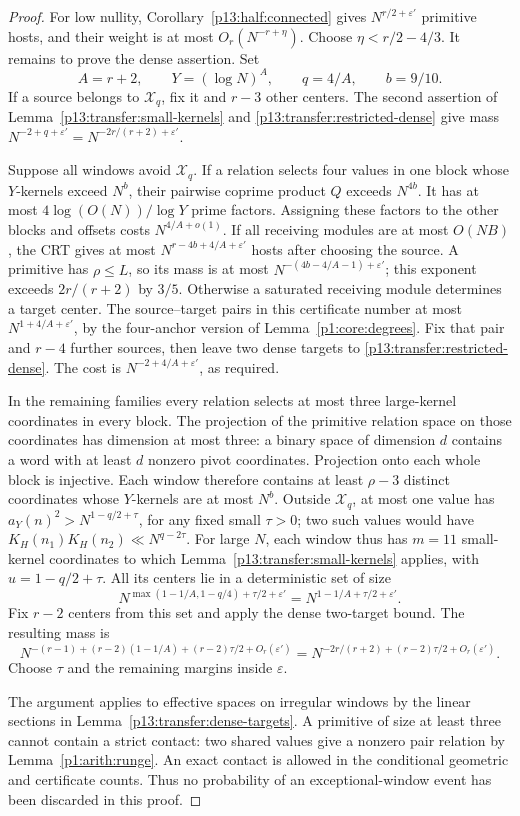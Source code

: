 \begin{proof}
For low nullity, Corollary~\ref{p13:half:connected} gives
$N^{r/2+\varepsilon'}$ primitive hosts, and their weight is at most
$O_r(N^{-r+\eta})$. Choose $\eta<r/2-4/3$.
It remains to prove the dense assertion. Set
\[
 A=r+2,\qquad Y=(\log N)^A,\qquad q=4/A,\qquad b=9/10.
\]
If a source belongs to $\mathcal X_q$, fix it and $r-3$ other centers.
The second assertion of Lemma~\ref{p13:transfer:small-kernels} and
\eqref{p13:transfer:restricted-dense} give mass
$N^{-2+q+\varepsilon'}=N^{-2r/(r+2)+\varepsilon'}$.

Suppose all windows avoid $\mathcal X_q$. If a relation selects four
values in one block whose $Y$-kernels exceed $N^b$, their pairwise
coprime product $Q$ exceeds $N^{4b}$. It has at most
$4\log(O(N))/\log Y$ prime factors. Assigning these factors to the
other blocks and offsets costs $N^{4/A+o(1)}$.
If all receiving modules are at most $O(NB)$, the CRT gives at most
$N^{r-4b+4/A+\varepsilon'}$ hosts after choosing the source.
A primitive has $\rho\leq L$, so its mass is at most
$N^{-(4b-4/A-1)+\varepsilon'}$; this exponent exceeds
$2r/(r+2)$ by $3/5$.
Otherwise a saturated receiving module determines a target center.
The source--target pairs in this certificate number at most
$N^{1+4/A+\varepsilon'}$, by the four-anchor version of
Lemma~\ref{p1:core:degrees}. Fix that pair and $r-4$ further sources,
then leave two dense targets to \eqref{p13:transfer:restricted-dense}.
The cost is $N^{-2+4/A+\varepsilon'}$, as required.

In the remaining families every relation selects at most three
large-kernel coordinates in every block. The projection of the
primitive relation space on those coordinates has dimension at most
three: a binary space of dimension $d$ contains a word with at least
$d$ nonzero pivot coordinates. Projection onto each whole block is
injective. Each window therefore contains at least $\rho-3$ distinct
coordinates whose $Y$-kernels are at most $N^b$.
Outside $\mathcal X_q$, at most one value has
$a_Y(n)^2>N^{1-q/2+\tau}$, for any fixed small $\tau>0$; two such
values would have $K_H(n_1)K_H(n_2)\ll N^{q-2\tau}$.
For large $N$, each window thus has $m=11$ small-kernel coordinates
to which Lemma~\ref{p13:transfer:small-kernels} applies, with
$u=1-q/2+\tau$. All its centers lie in a deterministic set of size
\[
 N^{\max(1-1/A,1-q/4)+\tau/2+\varepsilon'}
       =N^{1-1/A+\tau/2+\varepsilon'}.
\]
Fix $r-2$ centers from this set and apply the dense two-target bound.
The resulting mass is
\[
 N^{-(r-1)+(r-2)(1-1/A)+(r-2)\tau/2+O_r(\varepsilon')}
       =N^{-2r/(r+2)+(r-2)\tau/2+O_r(\varepsilon')}.
\]
Choose $\tau$ and the remaining margins inside $\varepsilon$.

The argument applies to effective spaces on irregular windows by the
linear sections in Lemma~\ref{p13:transfer:dense-targets}. A primitive
of size at least three cannot contain a strict contact: two shared
values give a nonzero pair relation by Lemma~\ref{p1:arith:runge}.
An exact contact is allowed in the conditional geometric and certificate
counts. Thus no probability of an exceptional-window event has been
discarded in this proof.
\end{proof}

